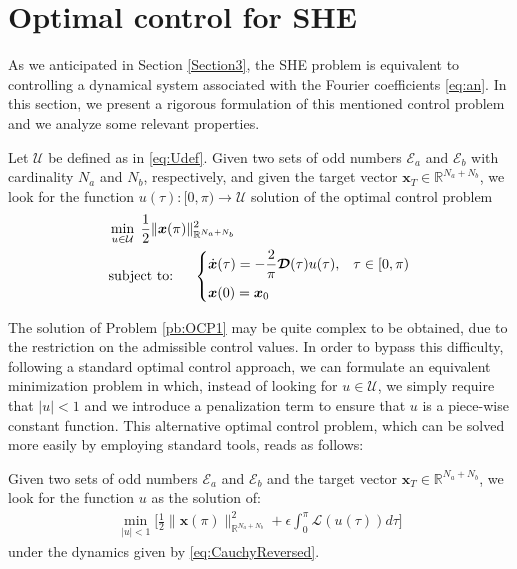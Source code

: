 \section{Optimal control for SHE}\label{Section4}

As we anticipated in Section \ref{Section3}, the SHE problem is equivalent to controlling a dynamical system associated with the Fourier coefficients \eqref{eq:an}. In this section, we present a rigorous formulation of this mentioned control problem and we analyze some relevant properties. 
\newline
\begin{problem}\label{pb:OCP1}
Let $\mathcal U$ be defined as in \eqref{eq:Udef}. Given two sets of odd numbers $\mathcal {E}_a $ and $\mathcal {E}_b $ with cardinality $N_a$ and $N_b$, respectively, and given the target vector $\bm{x}_T\in \mathbb{R}^{N_a+N_b}$, we look for the function $u(\tau):[0,\pi)\to \mathcal U$ solution of the optimal control problem  
\begin{align*}
	&\min_{u \in \mathcal{U}}\;\frac 12 \|\bm{x}(\pi)\|^2_{\mathbb{R}^{N_a+N_b}}
	\\
    &\notag \text{subject to: }\quad \begin{cases}
            \displaystyle \dot{\bm{x}}(\tau) = -\frac 2\pi\bm{\mathcal{D}}(\tau) u(\tau),  & \tau \in [0,\pi)\\[6pt]
            \bm{x}(0) = \bm{x}_0
    \end{cases}
    \end{align*}
\end{problem}
The solution of Problem \ref{pb:OCP1} may be quite complex to be obtained, due to the restriction on the admissible control values. In order to bypass this difficulty, following a standard optimal control approach, we can formulate an equivalent minimization problem in which, instead of looking for $u\in\mathcal U$, we simply require that $|u|<1$ and we introduce a penalization term to ensure that $u$ is a piece-wise constant function. This alternative optimal control problem, which can be solved more easily by employing standard tools, reads as follows:
\newline
\begin{problem}\label{pb:OCP2}
Given two sets of odd numbers $\mathcal E_a $ and $\mathcal E_b $ and the target vector $\bm{x}_T \in \mathbb {R}^{N_a + N_b}$, we look for the  function $u$ as the solution of:
\begin{align*}
	\min_{|u|<1} \Bigg[\frac 12 \|\bm{x}(\pi)\|^2_{\mathbb{R}^{N_a+N_b}} + \epsilon \int_0^{\pi} \mathcal{L}(u(\tau)) d\tau \Bigg]  
\end{align*}
under the dynamics given by \eqref{eq:CauchyReversed}.
\end{problem}


